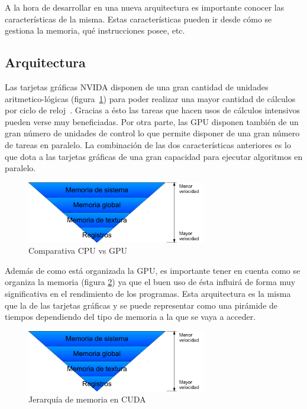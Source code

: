 A la hora de desarrollar en una nueva arquitectura es importante conocer las características de la misma. Estas características pueden ir desde cómo se gestiona la memoria, qué instrucciones posee, etc.

\subsection{Arquitectura}

Las tarjetas gráficas NVIDA disponen de una gran cantidad de unidades aritmetico-lógicas (figura~\ref{fig:cudaorggpu}) para poder realizar una mayor cantidad de cálculos por ciclo de reloj~\cite{nvidia:cuda_c_programming_guide}. Gracias a ésto las tareas que hacen usos de cálculos intensivos pueden verse muy beneficiadas. Por otra parte, las GPU disponen también de un gran número de unidades de control lo que permite disponer de una gran número de tareas en paralelo. La combinación de las dos características anteriores es lo que dota a las tarjetas gráficas de una gran capacidad para ejecutar algoritmos en paralelo.

\begin{figure}
	\centering
	\includegraphics[width=0.7\textwidth]{images/MemoriaCuda.pdf}
	\caption{Comparativa CPU vs GPU}\label{fig:cudaorggpu}
\end{figure}

Además de como está organizada la GPU, es importante tener en cuenta como se organiza la memoria (figura \ref{fig:memcuda}) ya que el buen uso de ésta influirá de forma muy significativa en el rendimiento de los programas. Esta arquitectura es la misma que la de las tarjetas gráficas y se puede representar como una pirámide de tiempos dependiendo del tipo de memoria a la que se vaya a acceder.

\begin{figure}
	\centering
	\includegraphics[width=0.7\textwidth]{images/MemoriaCuda.pdf}
	\caption{Jerarquía de memoria en CUDA}\label{fig:memcuda}
\end{figure}

